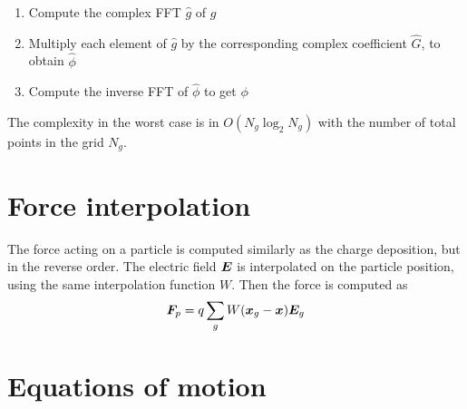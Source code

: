 %
\begin{enumerate}
\item Compute the complex FFT $\hat g$ of $g$
\item Multiply each element of $\hat g$ by the corresponding complex coefficient 
$\hat G$, to obtain $\hat \phi$
\item Compute the inverse FFT of $\hat \phi$ to get $\phi$
\end{enumerate}
%
The complexity in the worst case is in $O(N_g \log_2 N_g)$ with the number of 
total points in the grid $N_g$.

\section{Force interpolation}

The force acting on a particle is computed similarly as the charge deposition, 
but in the reverse order. The electric field $\bm{E}$ is interpolated on the 
particle position, using the same interpolation function $W$. Then the force is 
computed as
\begin{equation}%
\F_p = q \sum_{g} W(\x_g - \x) \E_g
\end{equation}%


\section{Equations of motion}

